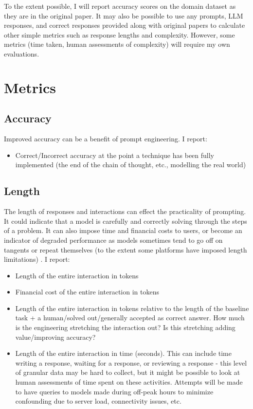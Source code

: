 \documentclass[11pt]{article}
\begin{document}
To the extent possible, I will report accuracy scores on the domain dataset as they are in the original paper. It may also be possible to use any prompts, LLM responses, and correct responses provided along with original papers to calculate other simple metrics such as response lengths and complexity. However, some metrics (time taken, human assessments of complexity) will require my own evaluations.

\section*{Metrics}

\subsection*{Accuracy}

Improved accuracy can be a benefit of prompt engineering. I report:

\begin{itemize}
  \item Correct/Incorrect accuracy at the point a technique has been fully implemented (the end of the chain of thought, etc., modelling the real world)
\end{itemize}

\subsection*{Length}

The length of responses and interactions can effect the practicality of prompting. It could indicate that a model is carefully and correctly solving through the steps of a problem. It can also impose time and financial costs to users, or become an indicator of degraded performance as models sometimes tend to go off on tangents or repeat themselves (to the extent some platforms have imposed length limitations) \cite{mann_microsoft_nodate}. I report:

\begin{itemize}
  \item Length of the entire interaction in tokens
  \item Financial cost of the entire interaction in tokens
  \item Length of the entire interaction in tokens relative to the length of the baseline task + a human/solved out/generally accepted as correct answer. How much is the engineering stretching the interaction out? Is this stretching adding value/improving accuracy?
  \item Length of the entire interaction in time (seconds). This can include time writing a response, waiting for a response, or reviewing a response - this level of granular data may be hard to collect, but it might be possible to look at human assessments of time spent on these activities. Attempts will be made to have queries to models made during off-peak hours to minimize confounding due to server load, connectivity issues, etc.
\end{itemize}
\end{document}
